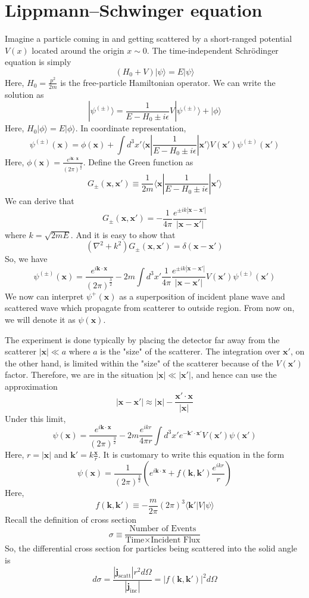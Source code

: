 \documentclass[cyan]{elegantnote}
\begin{document}
\section{Lippmann–Schwinger equation}
Imagine a particle coming in and getting scattered by a short-ranged potential $V(x)$ located around the origin $x \sim 0$. The time-independent Schr\"{o}dinger equation is simply
\[(H_0 + V)|\psi\rangle = E |\psi\rangle\]
Here, $H_0 = \frac{p^2}{2m}$ is the free-particle Hamiltonian operator. We can write the solution as
\[|\psi^{(\pm)}\rangle = \frac{1}{E-H_0 \pm i\epsilon}V|\psi^{(\pm)}\rangle + |\phi\rangle\]
Here, $H_0 |\phi\rangle = E |\phi\rangle$. In coordinate representation,
\[\psi^{(\pm)}(\mathbf{x}) = \phi(\mathbf{x}) + \int d^3x' \langle \mathbf{x} | \frac{1}{E-H_0 \pm i\epsilon} | \mathbf{x}' \rangle V(\mathbf{x}') \psi^{(\pm)}(\mathbf{x}')\]
Here, $\phi(\mathbf{x}) = \frac{e^{i\mathbf{k}\cdot\mathbf{x}}}{(2\pi)^{\frac{3}{2}}}$. Define the Green function as
\[G_{\pm}(\mathbf{x},\mathbf{x}') \equiv \frac{1}{2m} \langle \mathbf{x} | \frac{1}{E-H_0 \pm i\epsilon} | \mathbf{x}' \rangle\]
We can derive that
\[G_{\pm}(\mathbf{x},\mathbf{x}') = -\frac{1}{4\pi} \frac{e^{\pm ik|\mathbf{x}-\mathbf{x}'|}}{|\mathbf{x}-\mathbf{x}'|}\]
where $k = \sqrt{2mE}$. And it is easy to show that
\[(\nabla^2 + k^2)G_{\pm}(\mathbf{x},\mathbf{x}') = \delta(\mathbf{x}-\mathbf{x}')\]
So, we have
\[\psi^{(\pm)}(\mathbf{x}) = \frac{e^{i\mathbf{k}\cdot\mathbf{x}}}{(2\pi)^{\frac{3}{2}}} - 2m \int d^3x' \frac{1}{4\pi} \frac{e^{\pm ik|\mathbf{x}-\mathbf{x}'|}}{|\mathbf{x}-\mathbf{x}'|} V(\mathbf{x}') \psi^{(\pm)}(\mathbf{x}')\]
We now can interpret $\psi^{+}(\mathbf{x})$ as a superposition of incident plane wave and scattered wave which propagate from scatterer to outside region. From now on, we will denote it as $\psi(\mathbf{x})$.

The experiment is done typically by placing the detector far away from the scatterer $|\mathbf{x}| \ll a$ where $a$ is the "size" of the scatterer. The integration over $\mathbf{x}'$, on the other hand, is limited within the "size" of the scatterer because of the $V(\mathbf{x}')$ factor. Therefore, we are in the situation $|\mathbf{x}| \ll |\mathbf{x}'|$, and hence can use the approximation
\[|\mathbf{x}-\mathbf{x}'| \approx |\mathbf{x}| - \frac{\mathbf{x}' \cdot \mathbf{x}}{|\mathbf{x}|}\]
Under this limit,
\[\psi(\mathbf{x}) = \frac{e^{i\mathbf{k}\cdot\mathbf{x}}}{(2\pi)^{\frac{3}{2}}} - 2m \frac{e^{ikr}}{4\pi r} \int d^3x' e^{-\mathbf{k}' \cdot \mathbf{x}'} V(\mathbf{x}') \psi(\mathbf{x}')\]
Here, $r = |\mathbf{x}|$ and $\mathbf{k}' = k \frac{\mathbf{x}}{r}$. It is customary to write this equation in the form
\[\psi(\mathbf{x}) = \frac{1}{(2\pi)^{\frac{3}{2}}}\left( e^{i\mathbf{k}\cdot\mathbf{x}} +  f(\mathbf{k},\mathbf{k}') \frac{e^{ikr}}{r} \right) \]
Here,
\[f(\mathbf{k},\mathbf{k}') \equiv - \frac{m}{2\pi} (2\pi)^3  \langle \mathbf{k}'| V | \psi\rangle \]
Recall the definition of cross section
\[\sigma \equiv \frac{\mbox{Number of Events}}{\mbox{Time} \times \mbox{Incident Flux}}\]
So, the differential cross section for particles being scattered into the solid angle is
\[d\sigma = \frac{|\mathbf{j}_{\mathrm{scatt}}| r^2 d\Omega}{|\mathbf{j}_{\mathrm{inc}}|} = |f(\mathbf{k},\mathbf{k}')|^2 d\Omega\]
\end{document}
